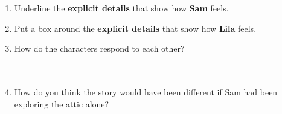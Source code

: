 \documentclass[12pt]{article}
\begin{document}
\vspace{1em}
\begin{tcolorbox}[colframe=black!60, colback=white, 
coltitle=black, colbacktitle=black!15, fonttitle=\bfseries\Large, 
title=Guided Practice, halign title=center, left=10pt, right=10pt, top=10pt, bottom=15pt]

\begin{enumerate}[itemsep=1em]

    \item Underline the \textbf{explicit details }that show how \textbf{Sam} feels.
    \item Put a box around the \textbf{explicit details} that show how \textbf{Lila} feels.
    \item How do the characters respond to each other?
    \\[0.8cm] \underline{\hspace{14cm}}  
    \\[0.8cm] \underline{\hspace{14cm}}  
    \\[0.8cm] \underline{\hspace{14cm}} 
    \item How do you think the story would have been different if Sam had been exploring the attic alone?
    \\[0.8cm] \underline{\hspace{14cm}}  
    \\[0.8cm] \underline{\hspace{14cm}}  
    \\[0.8cm] \underline{\hspace{14cm}} 
\end{enumerate}
\end{tcolorbox}

\vspace{1em}
\end{document}
